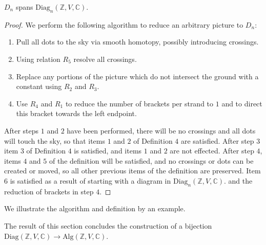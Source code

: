 \documentclass[11pt]{article} %
\begin{document}
\begin{prop}
$D_n$ spans $\text{Diag}_n({\mathbb{Z},V,\mathbb{C}})$.
\end{prop}
\begin{proof}
We perform the following algorithm to reduce an arbitrary picture to $D_n$:
\begin{enumerate}
\item Pull all dots to the sky via smooth homotopy, possibly introducing crossings.
\item Using relation $R_5$ resolve all crossings.
\item Replace any portions of the picture which do not intersect the ground with a constant using $R_2$ and $R_3$.
\item Use $R_4$ and $R_1$ to reduce the number of brackets per strand to $1$ and to direct this bracket towards the left endpoint.
\end{enumerate}
After steps $1$ and $2$ have been performed, there will be no crossings and all dots will touch the sky, so that items $1$ and $2$ of Definition $4$ are satisfied. After step $3$ item $3$ of Definition $4$ is satisfied, and items $1$ and $2$ are not effected. After step $4$, items $4$ and $5$ of the definition will be satisfied, and no crossings or dots can be created or moved, so all other previous items of the definition are preserved. Item $6$ is satisfied as a result of starting with a diagram in $\text{Diag}_n(\mathbb{Z},V,\mathbb{C})$. and the reduction of brackets in step $4$.
\end{proof}

We illustrate the algorithm and definition by an example.



The result of this section concludes the construction of a bijection $\text{Diag}({\mathbb{Z},V,\mathbb{C}}) \rightarrow \text{Alg}({\mathbb{Z},V,\mathbb{C}})$.
\end{document}
